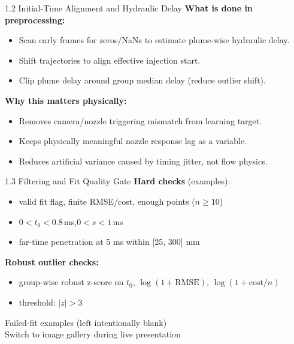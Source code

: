 \documentclass[UTF8,aspectratio=169]{ctexbeamer}
\begin{document}
\begin{frame}{1.2 Initial-Time Alignment and Hydraulic Delay}
\textbf{What is done in preprocessing:}
\begin{itemize}
  \item Scan early frames for zeros/NaNs to estimate plume-wise hydraulic delay.
  \item Shift trajectories to align effective injection start.
  \item Clip plume delay around group median delay (reduce outlier shift).
\end{itemize}

\vspace{0.3em}
\textbf{Why this matters physically:}
\begin{itemize}
  \item Removes camera/nozzle triggering mismatch from learning target.
  \item Keeps physically meaningful nozzle response lag as a variable.
  \item Reduces artificial variance caused by timing jitter, not flow physics.
\end{itemize}
\end{frame}

\begin{frame}{1.3 Filtering and Fit Quality Gate}
\textbf{Hard checks} (examples):
\begin{itemize}
  \item valid fit flag, finite RMSE/cost, enough points ($n\ge 10$)
  \item $0 < t_0 < 0.8\,$ms,\quad $0 < s < 1\,$ms
  \item far-time penetration at 5 ms within [25, 300] mm
\end{itemize}

\vspace{0.3em}
\textbf{Robust outlier checks:}
\begin{itemize}
  \item group-wise robust z-score on $t_0$, $\log(1+\mathrm{RMSE})$, $\log(1+\mathrm{cost}/n)$
  \item threshold: $|z| > 3$
\end{itemize}
\end{frame}

\begin{frame}[plain]
\centering
\vfill
{\LARGE Failed-fit examples (left intentionally blank)}\\[0.8em]
{\large Switch to image gallery during live presentation}
\vfill
\end{frame}
\end{document}
